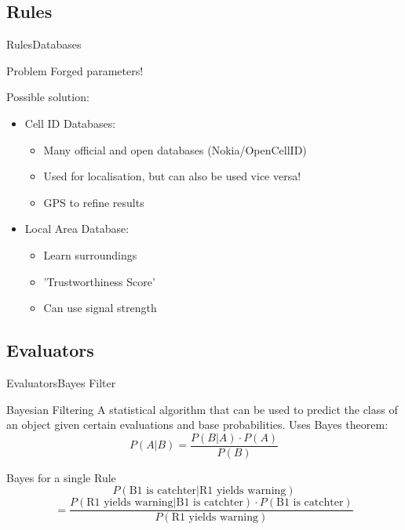 \documentclass{beamer}
\begin{document}
\subsection{Rules}
\begin{frame}{Rules}{Databases}
\begin{alertblock}{Problem}
Forged parameters!
\end{alertblock}
Possible solution:
\begin{itemize}
	\item Cell ID Databases:
	\begin{itemize}
		\item Many official and open databases (Nokia/OpenCellID)
		\item Used for localisation, but can also be used vice versa!
		\item GPS to refine results
	\end{itemize}
	\item Local Area Database:
	\begin{itemize}
		\item Learn surroundings
		\item 'Trustworthiness Score'
		\item Can use signal strength
	\end{itemize}
\end{itemize}
\end{frame}

\subsection{Evaluators}
\begin{frame}{Evaluators}{Bayes Filter}
\begin{block}{Bayesian Filtering}
A statistical algorithm that can be used to predict the class of an object given certain evaluations and base probabilities.
Uses Bayes theorem:
\[P(A\vert B)= \frac{P(B\vert A) \cdot P(A)}{P(B)}\]
\end{block}

\begin{exampleblock}{Bayes for a single Rule}
\[P(\text{B1 is catchter}\vert \text{R1 yields warning})\] 
\[=\frac{P(\text{R1 yields warning}\vert \text{B1 is catchter}) \cdot P(\text{B1 is catchter})}{P(\text{R1 yields warning})}\]
\end{exampleblock}
\end{frame}
\end{document}
